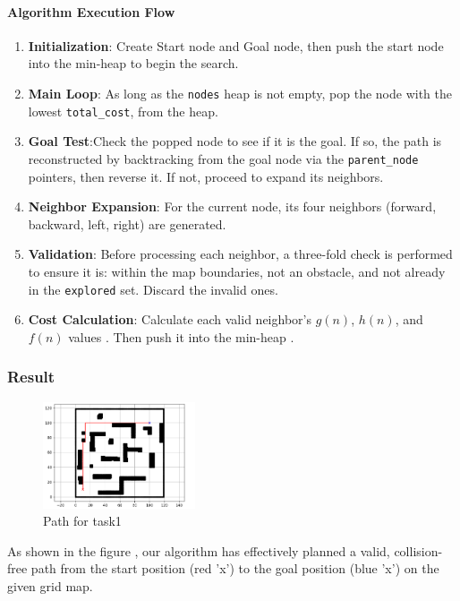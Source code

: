 \documentclass[aps,letterpaper,10pt]{revtex4}
\begin{document}
\paragraph{Algorithm Execution Flow}

\begin{enumerate}
	\item \textbf{Initialization}: Create Start node and Goal node, then push the start node into the min-heap to begin the search.

	\item \textbf{Main Loop}: As long as the \texttt{nodes} heap is not empty, pop the node with the lowest \texttt{total\_cost}, from the heap.

	\item \textbf{Goal Test}:Check the popped node to see if it is the goal. If so, the path is reconstructed by backtracking from the goal node via the \texttt{parent\_node} pointers, then reverse it. If not, proceed to expand its neighbors.

	\item \textbf{Neighbor Expansion}: For the current node, its four neighbors (forward, backward, left, right) are generated.

	\item \textbf{Validation}: Before processing each neighbor, a three-fold check is performed to ensure it is: within the map boundaries, not an obstacle, and not already in the \texttt{explored} set. Discard the invalid ones.

	\item \textbf{Cost Calculation}: Calculate each valid neighbor's $g(n)$, $h(n)$, and $f(n)$ values . Then push it into the min-heap .
\end{enumerate}

\subsubsection{Result}
\begin{figure}[h!]
    \centering %
    \includegraphics[width=0.4\textwidth]{task1.png} %
    \caption{Path for task1} %
    \label{fig:logo} %
\end{figure}
As shown in the figure , our algorithm has effectively planned a valid, collision-free path from the start position (red 'x') to the goal position (blue 'x') on the given grid map.
\end{document}

